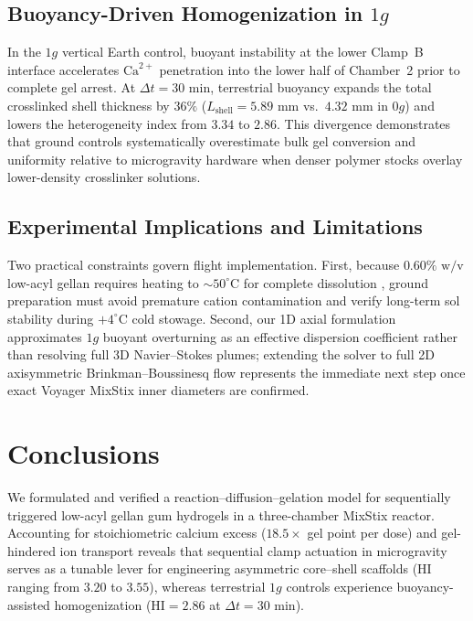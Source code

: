 \documentclass[11pt,twocolumn]{article}
\begin{document}
\subsection{Buoyancy-Driven Homogenization in $1g$}
In the $1g$ vertical Earth control, buoyant instability at the lower Clamp~B interface accelerates $\text{Ca}^{2+}$ penetration into the lower half of Chamber~2 prior to complete gel arrest. At $\Delta t = 30\text{ min}$, terrestrial buoyancy expands the total crosslinked shell thickness by $36\%$ ($L_{\mathrm{shell}} = 5.89\text{ mm}$ vs.\ $4.32\text{ mm}$ in $0g$) and lowers the heterogeneity index from $3.34$ to $2.86$. This divergence demonstrates that ground controls systematically overestimate bulk gel conversion and uniformity relative to microgravity hardware when denser polymer stocks overlay lower-density crosslinker solutions.


\subsection{Experimental Implications and Limitations}
Two practical constraints govern flight implementation. First, because $0.60\%\text{ w/v}$ low-acyl gellan requires heating to $\sim 50^\circ\text{C}$ for complete dissolution \cite{ambebila2019}, ground preparation must avoid premature cation contamination and verify long-term sol stability during $+4^\circ\text{C}$ cold stowage. Second, our 1D axial formulation approximates $1g$ buoyant overturning as an effective dispersion coefficient rather than resolving full 3D Navier--Stokes plumes; extending the solver to full 2D axisymmetric Brinkman--Boussinesq flow represents the immediate next step once exact Voyager MixStix inner diameters are confirmed.

\section{Conclusions}
We formulated and verified a reaction--diffusion--gelation model for sequentially triggered low-acyl gellan gum hydrogels in a three-chamber MixStix reactor. Accounting for stoichiometric calcium excess ($18.5\times$ gel point per dose) and gel-hindered ion transport reveals that sequential clamp actuation in microgravity serves as a tunable lever for engineering asymmetric core--shell scaffolds ($\mathrm{HI}$ ranging from $3.20$ to $3.55$), whereas terrestrial $1g$ controls experience buoyancy-assisted homogenization ($\mathrm{HI} = 2.86$ at $\Delta t = 30\text{ min}$).
\end{document}
